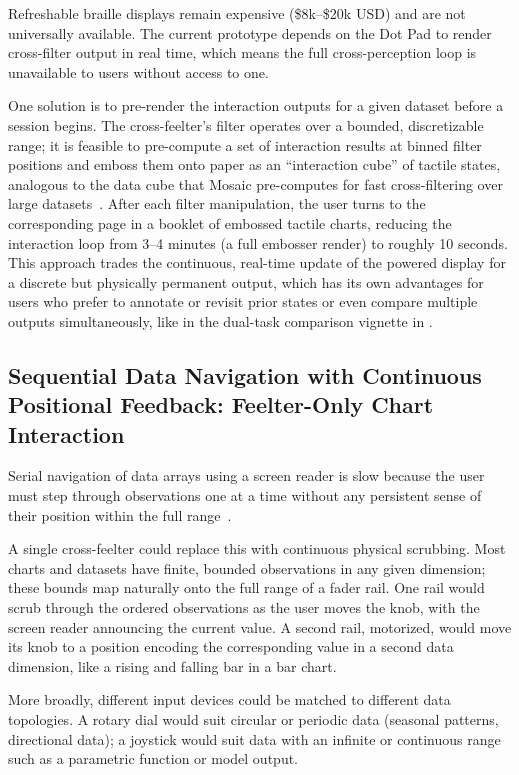 \documentclass[12pt]{cmuthesis}
\begin{document}
Refreshable braille displays remain expensive (\$8k--\$20k USD) and are not universally available. The current prototype depends on the Dot Pad to render cross-filter output in real time, which means the full cross-perception loop is unavailable to users without access to one.

One solution is to pre-render the interaction outputs for a given dataset before a session begins. The cross-feelter's filter operates over a bounded, discretizable range; it is feasible to pre-compute a set of interaction results at binned filter positions and emboss them onto paper as an ``interaction cube'' of tactile states, analogous to the data cube that Mosaic pre-computes for fast cross-filtering over large datasets~\cite{heer_mosaic_2023}. After each filter manipulation, the user turns to the corresponding page in a booklet of embossed tactile charts, reducing the interaction loop from 3--4 minutes (a full embosser render) to roughly 10 seconds. This approach trades the continuous, real-time update of the powered display for a discrete but physically permanent output, which has its own advantages for users who prefer to annotate or revisit prior states or even compare multiple outputs simultaneously, like in the dual-task comparison vignette in .

\subsection{Sequential Data Navigation with Continuous Positional Feedback: Feelter-Only Chart Interaction} %

Serial navigation of data arrays using a screen reader is slow because the user must step through observations one at a time without any persistent sense of their position within the full range~\cite{Elavsky2023}.

A single cross-feelter could replace this with continuous physical scrubbing. Most charts and datasets have finite, bounded observations in any given dimension; these bounds map naturally onto the full range of a fader rail. One rail would scrub through the ordered observations as the user moves the knob, with the screen reader announcing the current value. A second rail, motorized, would move its knob to a position encoding the corresponding value in a second data dimension, like a rising and falling bar in a bar chart.

More broadly, different input devices could be matched to different data topologies. A rotary dial would suit circular or periodic data (seasonal patterns, directional data); a joystick would suit data with an infinite or continuous range such as a parametric function or model output.
\end{document}
